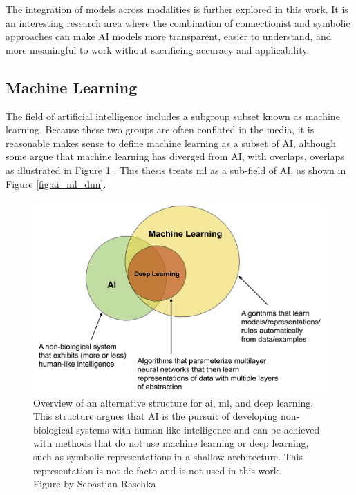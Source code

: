     The integration of models across modalities is further explored in this work. It is an interesting research area where the combination of connectionist and symbolic approaches can make AI models more transparent, easier to understand, and more meaningful to work without sacrificing accuracy and applicability.


    \subsection{Machine Learning}

    The field of artificial intelligence includes a subgroup subset known as machine learning. Because these two groups are often conflated in the media, it is reasonable makes sense to define machine learning as a subset of AI, although some argue that machine learning has diverged from AI, with overlaps, overlaps as illustrated in Figure \ref{fig:ai_ml_dnn_argue} \cite{raschkaChapterIntroductionMachine2020}. This thesis treats \gls{ml} as a sub-field of AI, as shown in Figure \ref{fig:ai_ml_dnn}.


    \begin{figure}[htb]
        \centering
        \includegraphics[width=\linewidth]{images/ai_ml_dnn_argue.jpeg}
        \caption[Overview of an alternative structure for \gls{ai}, \gls{ml}, and deep learning. This structure argues that AI is the pursuit of developing non-biological systems with human-like intelligence and can be achieved with methods that do not use machine learning or deep learning, such as symbolic representations in a shallow architecture.]{Overview of an alternative structure for \gls{ai}, \gls{ml}, and deep learning. This structure argues that AI is the pursuit of developing non-biological systems with human-like intelligence and can be achieved with methods that do not use machine learning or deep learning, such as symbolic representations in a shallow architecture. This representation is not de facto and is not used in this work.\\Figure by Sebastian Raschka \cite{raschkaChapterIntroductionMachine2020}}
        \label{fig:ai_ml_dnn_argue}
    \end{figure} 

